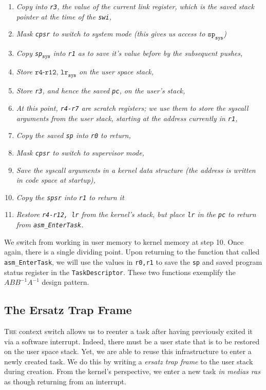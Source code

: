 \documentclass{article}
\begin{document}
\begin{enumerate}
	\item \textit{Copy into \texttt{r3}, the value of the current link register,
		which is the saved stack pointer at the time of the \texttt{swi},}
	\item \textit{Mask \texttt{cpsr} to switch to system mode (this gives us
		access to $\texttt{sp}_\texttt{sys}$)}
	\item \textit{Copy \texttt{sp}$_\texttt{sys}$ into \texttt{r1} as to save
		it's value before by the subsequent pushes,}
	\item \textit{Store $\texttt{r4-r12, lr}_\texttt{sys}$ on the user space
		stack,}
	\item \textit{Store \texttt{r3}, and hence the saved \texttt{pc}, on the
		user's stack,}
	\item \textit{At this point, \texttt{r4-r7} are scratch registers; we use
		them to store the syscall arguments from the user stack, starting at the
		address currently in \texttt{r1},}
	\item \textit{Copy the saved \texttt{sp} into \texttt{r0} to return,}
	\item \textit{Mask \texttt{cpsr} to switch to supervisor mode,}
	\item \textit{Save the syscall arguments in a kernel data structure (the
		address is written in code space at startup),}
	\item \textit{Copy the \texttt{spsr} into \texttt{r1} to return it}
	\item \textit{Restore \texttt{r4-r12, lr} from the kernel's stack, but place
		\texttt{lr} in the \texttt{pc} to return from  \texttt{asm\_EnterTask}.}
\end{enumerate}

We switch from working in user memory to kernel memory at step 10. Once again,
there is a single dividing point. Upon returning to the function that called
\texttt{asm\_EnterTask}, we will use the values in \texttt{r0,r1} to save the
\texttt{sp} and saved program status register in the \texttt{TaskDescriptor}.
These two functions exemplify the $ABB^{-1}A^{-1}$ design pattern.

\subsection*{The Ersatz Trap Frame}

\textsc{The} context switch allows us to reenter a task after having previously exited it
via a software interrupt. Indeed, there must be a user state that is to be
restored on the user space stack. Yet, we are able to reuse this infrastructure
to enter a newly created task. We do this by writing a \textit{ersatz trap
frame} to the user stack during creation. From the kernel's perspective, we
enter a new task \textit{in medias ras} as though returning from an interrupt.
\end{document}
